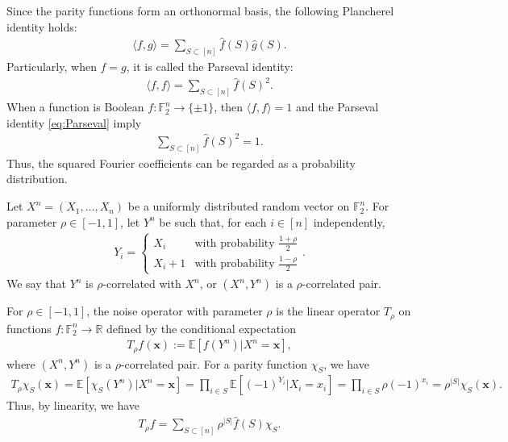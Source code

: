 \documentclass[journal,draftcls, onecolumn]{IEEEtran}
\begin{document}
Since the parity functions form an orthonormal basis, the following Plancherel identity holds:
\begin{align} \label{eq:Plancherel}
\langle f, g \rangle = \sum_{S \subset [n]} \widehat{f}(S) \widehat{g}(S).
\end{align}
Particularly, when $f=g$, it is called the Parseval identity:
\begin{align} \label{eq:Parseval}
\langle f,f \rangle = \sum_{S \subset [n]} \widehat{f}(S)^2.
\end{align}
When a function is Boolean $f: \mathbb{F}_2^n \to \{\pm 1\}$, then 
$\langle f, f \rangle=1$ and the Parseval identity \eqref{eq:Parseval} imply
\begin{align} \label{eq:Parseval-Boolean}
\sum_{S \subset [n]} \widehat{f}(S)^2 = 1.
\end{align}
Thus, the squared Fourier coefficients can be regarded as a probability distribution.

Let $X^n = (X_1,\ldots,X_n)$ be a uniformly distributed random vector on $\mathbb{F}_2^n$.
For parameter $\rho \in [-1,1]$, let $Y^n$ be such that, for each $i \in [n]$ independently, 
\begin{align} \label{eq:rho-correlated}
Y_i = \left\{
\begin{array}{ll}
X_i & \mbox{with probability } \frac{1+\rho}{2} \\
X_i + 1 & \mbox{with probability } \frac{1-\rho}{2}
\end{array}
\right..
\end{align}
We say that $Y^n$ is $\rho$-correlated with $X^n$, or $(X^n,Y^n)$ is a $\rho$-correlated pair. 

For $\rho \in [-1,1]$, the noise operator with parameter $\rho$ is the linear operator $T_\rho$ on functions $f:\mathbb{F}_2^n \to \mathbb{R}$ 
defined by the conditional expectation
\begin{align*}
T_\rho f(\bm{x}) := \mathbb{E}[f(Y^n) | X^n = \bm{x}],
\end{align*}
where $(X^n,Y^n)$ is a $\rho$-correlated pair. For a parity function $\chi_S$, we have
\begin{align}
T_\rho \chi_S(\bm{x}) = \mathbb{E}[\chi_S(Y^n) | X^n = \bm{x}] = \prod_{i \in S} \mathbb{E}[ (-1)^{Y_i} | X_i = x_i] = \prod_{i \in S} \rho (-1)^{x_i} = \rho^{|S|} \chi_S(\bm{x}).
\label{eq:affect-of-noise-operator}
\end{align}
Thus, by linearity, we have
\begin{align} \label{eq:noise-operator-effect}
T_\rho f = \sum_{S \subset [n]} \rho^{|S|} \widehat{f}(S) \chi_S.
\end{align}
\end{document}
